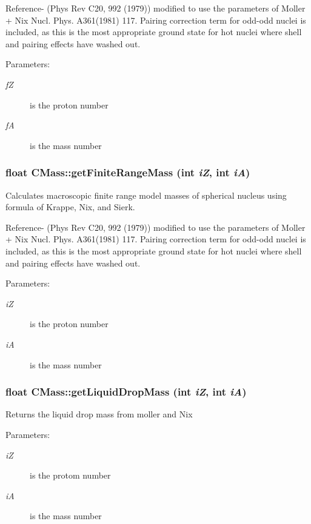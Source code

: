 Reference- (Phys Rev C20, 992 (1979)) modified to use the parameters of Moller + Nix Nucl. Phys. A361(1981) 117. Pairing correction term for odd-odd nuclei is included, as this is the most appropriate ground state for hot nuclei where shell and pairing effects have washed out. \begin{Desc}
\item[Parameters:]
\begin{description}
\item[{\em f\-Z}]is the proton number \item[{\em f\-A}]is the mass number \end{description}
\end{Desc}
\subsubsection{\setlength{\rightskip}{0pt plus 5cm}float CMass::get\-Finite\-Range\-Mass (int {\em i\-Z}, int {\em i\-A})}\label{classCMass_e0a6619be4dd82e97a7ba156af853c9e}


Calculates macroscopic finite range model masses of spherical nucleus using formula of Krappe, Nix, and Sierk.

Reference- (Phys Rev C20, 992 (1979)) modified to use the parameters of Moller + Nix Nucl. Phys. A361(1981) 117. Pairing correction term for odd-odd nuclei is included, as this is the most appropriate ground state for hot nuclei where shell and pairing effects have washed out. \begin{Desc}
\item[Parameters:]
\begin{description}
\item[{\em i\-Z}]is the proton number \item[{\em i\-A}]is the mass number \end{description}
\end{Desc}
\subsubsection{\setlength{\rightskip}{0pt plus 5cm}float CMass::get\-Liquid\-Drop\-Mass (int {\em i\-Z}, int {\em i\-A})}\label{classCMass_360701840914ad23d7ed3c3874ce0fc1}


Returns the liquid drop mass from moller and Nix \begin{Desc}
\item[Parameters:]
\begin{description}
\item[{\em i\-Z}]is the protom number \item[{\em i\-A}]is the mass number \end{description}
\end{Desc}
